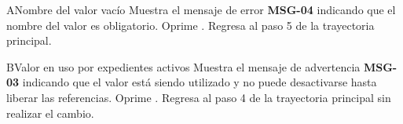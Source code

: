 \begin{UCtrayectoriaA}{A}{Nombre del valor vacío}
	\UCpaso Muestra el mensaje de error \textbf{MSG-04} indicando que el nombre del valor es obligatorio.
	\UCpaso[\UCactor] Oprime .
	\UCpaso Regresa al paso 5 de la trayectoria principal.
\end{UCtrayectoriaA}

\begin{UCtrayectoriaA}{B}{Valor en uso por expedientes activos}
	\UCpaso Muestra el mensaje de advertencia \textbf{MSG-03} indicando que el valor está siendo utilizado y no puede desactivarse hasta liberar las referencias.
	\UCpaso[\UCactor] Oprime .
	\UCpaso Regresa al paso 4 de la trayectoria principal sin realizar el cambio.
\end{UCtrayectoriaA}

